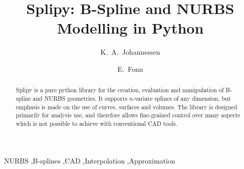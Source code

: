 \documentclass[preprint,12pt, a4paper]{elsarticle}
\begin{document}
\begin{frontmatter}



\title{Splipy: B-Spline and NURBS Modelling in Python}


\author{K.~A.~Johannessen}
\author{E.~Fonn}

\address{SINTEF Digital, PO Box 4760, 7465, Trondheim, Norway\\
         Kjetil.Johannessen@sintef.no \\
         Eivind.Fonn@sintef.no
         }

\begin{abstract}
Splipy is a pure python library for the creation, evaluation and manipulation of B-spline and NURBS geometries.
It supports $n$-variate splines of any dimension, but emphasis is made on the use of curves, surfaces and volumes.
The library is designed primarily for analysis use, and therefore allows fine-grained control over many aspects which is not possible to achieve with conventional CAD tools.

\end{abstract}

\begin{keyword}
NURBS \sep B-splines \sep CAD \sep Interpolation \sep Approximation



\end{keyword}

\end{frontmatter}
\end{document}
